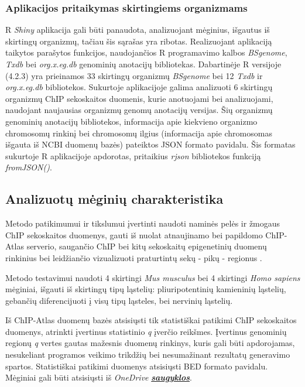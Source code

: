 \documentclass[12pt]{article}
\begin{document}
\subsubsection*{Aplikacijos pritaikymas skirtingiems organizmams}
R \emph{Shiny} aplikacija gali būti panaudota, analizuojant mėginius, išgautus
iš skirtingų or\-ga\-niz\-mų, tačiau šis sąrašas yra ribotas. Realizuojant
aplikaciją taikytos parašytos funkcijos, naudojančios R programavimo kalbos
\emph{BSgenome}, \emph{Txdb} bei \emph{org.x.eg.db} genominių anotacijų
bibliotekas. Dabartinėje R versijoje (4.2.3) yra prieinamos 33 skirtingų
organizmų \emph{BSgenome} bei 12 \emph{Txdb} ir \emph{org.x.eg.db} bibliotekos.
Sukurtoje aplikacijoje galima analizuoti 6 skirtingų organizmų ChIP sekoskaitos
duomenis, kurie anotuojami bei analizuojami, naudojant naujausias organizmų
genomų anotacijų versijas. Šių organizmų genominių anotacijų bibliotekos,
informacija apie kiekvieno organizmo chromosomų rinkinį bei chromosomų ilgius
(informacija apie chromosomas išgauta iš NCBI \cite{NCBI} duomenų bazės)
pateiktos JSON formato pavidalu. Šis formatas sukurtoje
R aplikacijoje apdorotas, pritaikius \emph{rjson} \cite{RJSON} bibliotekos
funkciją \emph{fromJSON()}.

\newpage


\subsection{Analizuotų mėginių charakteristika}
Metodo patikimumui ir tikslumui įvertinti naudoti naminės pelės ir žmogaus
ChIP se\-kos\-kai\-tos duomenys, gauti iš nuolat atnaujinamo bei papildomo
ChIP-Atlas \cite{CHIPATLAS} serverio, saugančio ChIP bei kitų sekoskaitų
epigenetinių duomenų rinkinius bei leidžiančio vizualizuoti praturtintų sekų -
pikų - regionus \cite{CHIPATLAS2}.

Metodo testavimui naudoti 4 skirtingi \emph{Mus musculus}
bei 4 skirtingi \emph{Homo sapiens} mėginiai, išgauti iš
skirtingų tipų ląstelių: pliuripotentinių kamieninių ląstelių, gebančių
diferencijuoti į visų tipų ląsteles, bei nervinių ląstelių.

Iš ChIP-Atlas duomenų bazės atsisiųsti tik statistiškai patikimi ChIP
sekoskaitos duomenys, atrinkti įvertinus statistinio \emph{q} įverčio reikšmes.
Įvertinus genominių regionų \emph{q} vertes gautas mažesnis duomenų rinkinys,
kuris gali būti apdorojamas, nesukeliant programos veikimo trikdžių bei
nesumažinant rezultatų generavimo spartos. Statistiškai patikimi duomenys
atsisiųsti BED formato pavidalu. Mėginiai gali būti atsisiųsti iš
\emph{OneDrive} \href{https://vult-my.sharepoint.com/:f:/g/personal/daniele_stasiunaite_mif_stud_vu_lt/EtEGQ8POkapLhPv6eHvl48cB-jmes81M0JPW8PVWTz2QgA?e=wjSSKJ}{\emph{\textbf{saugyklos}}}.
\end{document}
